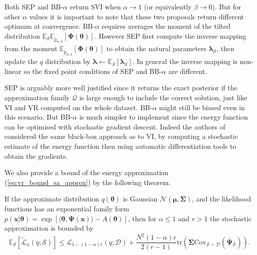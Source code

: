 Both SEP and BB-$\alpha$ return SVI when $\alpha \rightarrow 1$ (or equivalently $\beta \rightarrow 0$). But for other $\alpha$ values it is important to note that these two proposals return different optimum at convergence. BB-$\alpha$ requires averages the moment of the tilted distribution $\mathbb{E}_{\mathcal{S}} \mathbb{E}_{\tilde{p}_{\alpha, \mathcal{S}}}[\bm{\Phi}(\bm{\theta})]$. However SEP first compute the inverse mapping from the moment $\mathbb{E}_{\tilde{p}_{\alpha, \mathcal{S}}}[\bm{\Phi}(\bm{\theta})]$ to obtain the natural parameters $\bm{\lambda}_{\mathcal{S}}$, then update the $q$ distribution by $\bm{\lambda} \leftarrow \mathbb{E}_{\mathcal{S}}[\bm{\lambda}_{\mathcal{S}}]$. In general the inverse mapping is non-linear so the fixed point conditions of SEP and BB-$\alpha$ are different.

SEP is arguably more well justified since it returns the exact posterior if the approximation family $\mathcal{Q}$ is large enough to include the correct solution, just like VI and VR computed on the whole dataset. BB-$\alpha$ might still be biased even in this scenario. But BB-$\alpha$ is much simpler to implement since the energy function can be optimised with stochastic gradient descent. Indeed the authors of \cite{hernandez-lobato:bb-alpha} considered the same black-box approach as to VI, by computing a stochastic estimate of the energy function then using automatic differentiation tools to obtain the gradients. 

We also provide a bound of the energy approximation (\ref{eq:vr_bound_sa_approx}) by the following theorem.
%
\begin{theorem}
\label{thm:stochastic_approx}
If the approximate distribution $q(\bm{\theta})$ is Gaussian $\mathcal{N}(\bm{\mu}, \bm{\Sigma})$, and the likelihood functions has an exponential family form $p(\bm{x}|\bm{\theta}) = \exp [\langle \bm{\theta}, \bm{\Psi}(\bm{x}) \rangle - A(\bm{\theta})]$, then for $\alpha \leq 1$ and $r > 1$ the stochastic approximation is bounded by
\begin{equation*}
\mathbb{E}_{\mathcal{S}} [\tilde{\mathcal{L}}_{\alpha}(q; \mathcal{S})] \leq \mathcal{L}_{1 - (1 - \alpha)r}(q; \mathcal{D}) + \frac{N^2(1-\alpha) r}{2(r - 1)}  \mathrm{tr}(\bm{\Sigma} \mathrm{Cov}_{\mathcal{S} \sim \mathcal{D}}( \bar{\bm{\Psi}}_{\mathcal{S}})).
\end{equation*}
\end{theorem}

